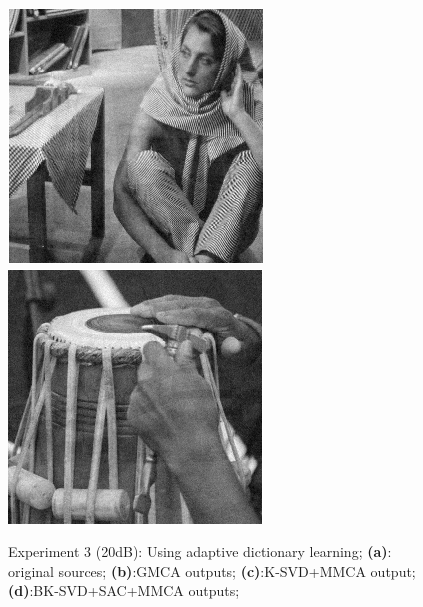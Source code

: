 \begin{figure}[!htbp]
{\begin{minipage}[b]{0.23\linewidth}
\includegraphics[width=1\linewidth]{images/bk2.png}\vspace{4pt}
\includegraphics[width=1\linewidth]{images/bk4.png}
\end{minipage}}
\caption{Experiment 3 (20dB): Using adaptive dictionary learning; \textbf{(a)}: original sources; \textbf{(b)}:GMCA outputs; \textbf{(c)}:K-SVD+MMCA output; \textbf{(d)}:BK-SVD+SAC+MMCA outputs;}
\label{apt_compare}
\end{figure}

